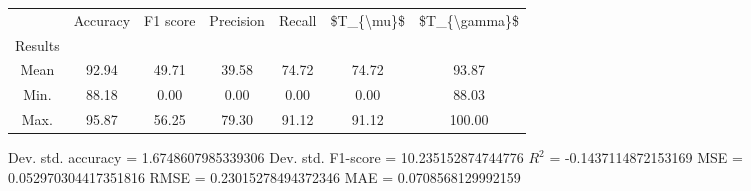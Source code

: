 \begin{tabular}{|c|c|c|c|c|c|c|}
\toprule
{} &  Accuracy &  F1 score &  Precision &  Recall &  \$T\_\{\textbackslash mu\}\$ &  \$T\_\{\textbackslash gamma\}\$ \\
Results &           &           &            &         &            &               \\
\hline
Mean    &     92.94 &     49.71 &      39.58 &   74.72 &      74.72 &         93.87 \\
Min.    &     88.18 &      0.00 &       0.00 &    0.00 &       0.00 &         88.03 \\
Max.    &     95.87 &     56.25 &      79.30 &   91.12 &      91.12 &        100.00 \\
\bottomrule
\end{tabular}

 Dev. std. accuracy = 1.6748607985339306
 Dev. std. F1-score = 10.235152874744776
 $R^2$ = -0.1437114872153169
 MSE = 0.052970304417351816
 RMSE = 0.23015278494372346
 MAE = 0.0708568129992159